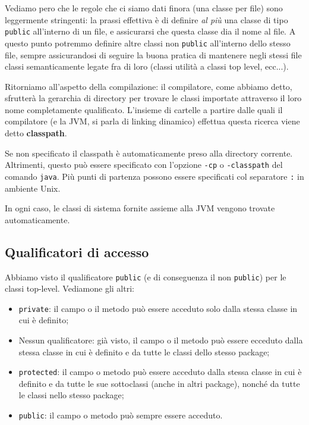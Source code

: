 \documentclass[a4paper,11pt]{article}
\begin{document}
Vediamo pero che le regole che ci siamo dati finora (una classe per file) sono leggermente stringenti: la prassi effettiva è di definire \textit{al più} una classe di tipo \lstinline|public| all'interno di un file, e assicurarsi che questa classe dia il nome al file.
A questo punto potremmo definire altre classi non \lstinline|public| all'interno dello stesso file, sempre assicurandosi di seguire la buona pratica di mantenere negli stessi file classi semanticamente legate fra di loro (classi utilità a classi top level, ecc...).

Ritorniamo all'aspetto della compilazione: il compilatore, come abbiamo detto, sfrutterà la gerarchia di directory per trovare le classi importate attraverso il loro nome completamente qualificato.
L'insieme di cartelle a partire dalle quali il compilatore (e la JVM, si parla di linking dinamico) effettua questa ricerca viene detto \textbf{classpath}.

Se non specificato il classpath è automaticamente preso alla directory corrente.
Altrimenti, questo può essere specificato con l'opzione \lstinline|-cp| o \lstinline|-classpath| del comando \lstinline|java|.
Più punti di partenza possono essere specificati col separatore \lstinline|:| in ambiente Unix.

In ogni caso, le classi di sistema fornite assieme alla JVM vengono trovate automaticamente.

\subsection{Qualificatori di accesso}
Abbiamo visto il qualificatore \lstinline|public| (e di conseguenza il non \lstinline|public|) per le classi top-level. Vediamone gli altri:
\begin{itemize}
	\item \lstinline|private|: il campo o il metodo può essere acceduto solo dalla stessa classe in cui è definito;
	\item Nessun qualificatore: già visto, il campo o il metodo può essere ecceduto dalla stessa classe in cui è definito e da tutte le classi dello stesso package;
	\item \lstinline|protected|: il campo o metodo può essere acceduto dalla stessa classe in cui è definito e da tutte le sue sottoclassi (anche in altri package), nonché da tutte le classi nello stesso package;
	\item \lstinline|public|: il campo o metodo può sempre essere acceduto.
\end{itemize}
\end{document}
